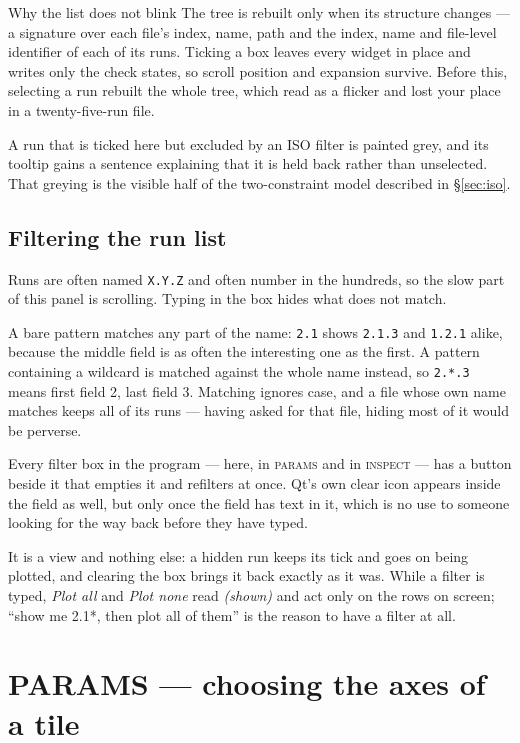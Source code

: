 \documentclass[11pt,a4paper,oneside]{report}
\newcommand{\code}[1]{\texttt{#1}}
\newcommand{\tab}[1]{\textsc{#1}}
\begin{document}
\begin{aoenote}{Why the list does not blink}
The tree is rebuilt only when its structure changes --- a signature over each
file's index, name, path and the index, name and file-level identifier of each of
its runs. Ticking a box leaves every widget in place and writes only the check
states, so scroll position and expansion survive. Before this, selecting a run
rebuilt the whole tree, which read as a flicker and lost your place in a
twenty-five-run file.
\end{aoenote}

A run that is ticked here but excluded by an ISO filter is painted grey, and its
tooltip gains a sentence explaining that it is held back rather than unselected.
That greying is the visible half of the two-constraint model described in
\S\ref{sec:iso}.

\subsection{Filtering the run list}


Runs are often named \code{X.Y.Z} and often number in the hundreds, so the slow
part of this panel is scrolling. Typing in the box hides what does not match.

A bare pattern matches any part of the name: \code{2.1} shows \code{2.1.3} and
\code{1.2.1} alike, because the middle field is as often the interesting one as
the first. A pattern containing a wildcard is matched against the whole name
instead, so \code{2.*.3} means first field 2, last field 3. Matching ignores
case, and a file whose own name matches keeps all of its runs --- having asked
for that file, hiding most of it would be perverse.

Every filter box in the program --- here, in \tab{params} and in
\tab{inspect} --- has a button beside it that empties it and refilters at
once. Qt's own clear icon appears inside the field as well, but only once the
field has text in it, which is no use to someone looking for the way back
before they have typed.

It is a view and nothing else: a hidden run keeps its tick and goes on being
plotted, and clearing the box brings it back exactly as it was. While a filter
is typed, \emph{Plot all} and \emph{Plot none} read \emph{(shown)} and act only
on the rows on screen; ``show me 2.1*, then plot all of them'' is the reason to
have a filter at all.

\section{PARAMS --- choosing the axes of a tile}
\label{sec:params}
\end{document}

